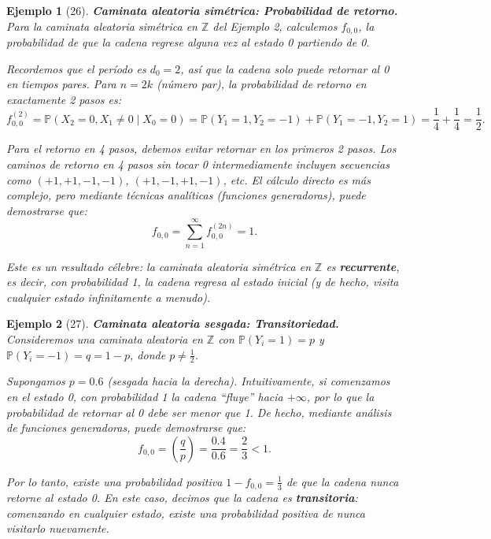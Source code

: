\documentclass[12pt]{book}
\newtheorem{example}{Ejemplo}[chapter]
\begin{document}
\begin{example}[26]
\textbf{Caminata aleatoria simétrica: Probabilidad de retorno.} Para la caminata aleatoria simétrica en $\mathbb{Z}$ del Ejemplo 2, calculemos $f_{0,0}$, la probabilidad de que la cadena regrese alguna vez al estado 0 partiendo de 0.

Recordemos que el período es $d_0 = 2$, así que la cadena solo puede retornar al 0 en tiempos pares. Para $n = 2k$ (número par), la probabilidad de retorno en exactamente 2 pasos es:
\[
f_{0,0}^{(2)} = \mathbb{P}(X_2 = 0, X_1 \neq 0 \mid X_0 = 0) = \mathbb{P}(Y_1 = 1, Y_2 = -1) + \mathbb{P}(Y_1 = -1, Y_2 = 1) = \frac{1}{4} + \frac{1}{4} = \frac{1}{2}.
\]

Para el retorno en 4 pasos, debemos evitar retornar en los primeros 2 pasos. Los caminos de retorno en 4 pasos sin tocar 0 intermediamente incluyen secuencias como $(+1, +1, -1, -1)$, $(+1, -1, +1, -1)$, etc. El cálculo directo es más complejo, pero mediante técnicas analíticas (funciones generadoras), puede demostrarse que:
\[
f_{0,0} = \sum_{n=1}^{\infty} f_{0,0}^{(2n)} = 1.
\]

Este es un resultado célebre: la caminata aleatoria simétrica en $\mathbb{Z}$ es \textbf{recurrente}, es decir, con probabilidad 1, la cadena regresa al estado inicial (y de hecho, visita cualquier estado infinitamente a menudo).
\end{example}

\begin{example}[27]
\textbf{Caminata aleatoria sesgada: Transitoriedad.} Consideremos una caminata aleatoria en $\mathbb{Z}$ con $\mathbb{P}(Y_i = 1) = p$ y $\mathbb{P}(Y_i = -1) = q = 1 - p$, donde $p \neq \frac{1}{2}$.

Supongamos $p = 0.6$ (sesgada hacia la derecha). Intuitivamente, si comenzamos en el estado 0, con probabilidad 1 la cadena ``fluye'' hacia $+\infty$, por lo que la probabilidad de retornar al 0 debe ser menor que 1. De hecho, mediante análisis de funciones generadoras, puede demostrarse que:
\[
f_{0,0} = \left(\frac{q}{p}\right) = \frac{0.4}{0.6} = \frac{2}{3} < 1.
\]

Por lo tanto, existe una probabilidad positiva $1 - f_{0,0} = \frac{1}{3}$ de que la cadena nunca retorne al estado 0. En este caso, decimos que la cadena es \textbf{transitoria}: comenzando en cualquier estado, existe una probabilidad positiva de nunca visitarlo nuevamente.
\end{example}
\end{document}
